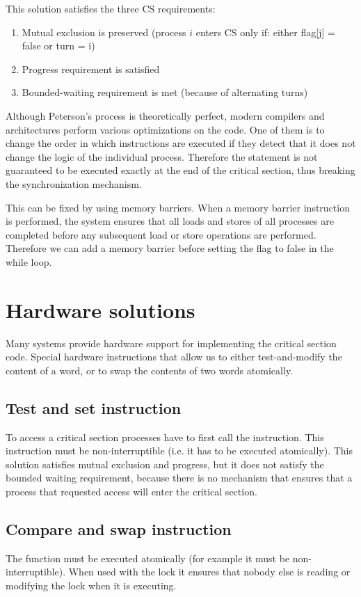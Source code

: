 This solution satisfies the three CS requirements:
\begin{enumerate}
    \item Mutual exclusion is preserved (process $i$ enters CS only if: either flag[j] = false or turn = i)
    \item Progress requirement is satisfied
    \item Bounded-waiting requirement is met (because of alternating turns)
\end{enumerate}

Although Peterson's process is theoretically perfect, modern compilers and architectures perform various optimizations on the code. One of them is to change the order in which instructions are executed if they detect that it does not change the logic of the individual process. Therefore the  statement is not guaranteed to be executed exactly at the end of the critical section, thus breaking the synchronization mechanism.

This can be fixed by using memory barriers. When a memory barrier instruction is performed, the system ensures that all loads and stores of all processes are completed before any subsequent load or store operations are performed. Therefore we can add a memory barrier before setting the flag to false in the while loop.

\section{Hardware solutions}
Many systems provide hardware support for implementing the critical section code. Special hardware instructions that allow us to either test-and-modify the content of a word, or to swap the contents of two words atomically.

\subsection{Test and set instruction}
To access a critical section processes have to first call the  instruction. This instruction must be non-interruptible (i.e. it has to be executed atomically).
This solution satisfies mutual exclusion and progress, but it does not satisfy the bounded waiting requirement, because there is no mechanism that ensures that a process that requested access will enter the critical section.

\subsection{Compare and swap instruction}
The  function must be executed atomically (for example it must be non-interruptible). When used with the lock it ensures that nobody else is reading or modifying the lock when it is executing.

